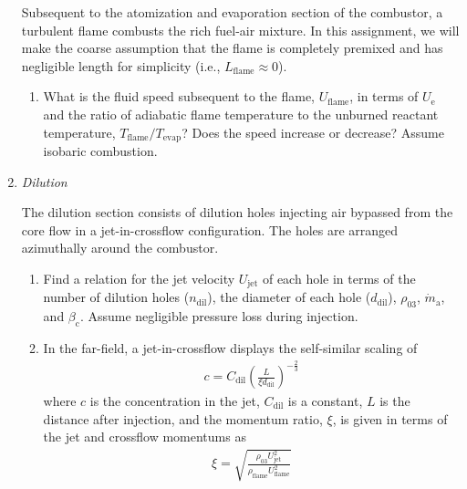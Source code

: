 \documentclass[11pt]{article}
\begin{document}
\begin{enumerate}[label=(\alph*)]
    	Subsequent to the atomization and evaporation section of the combustor, a turbulent flame combusts the rich fuel-air mixture. In this assignment, we will make the coarse assumption that the flame is completely premixed and has negligible length for simplicity (i.e., $L_\mathrm{flame}\approx 0$).  
        \begin{enumerate}[label=(\roman*)]
        	\item
            	What is the fluid speed subsequent to the flame, $U_\mathrm{flame}$, in terms of $U_\mathrm{e}$ and the ratio of adiabatic flame temperature to the unburned reactant temperature, $T_\mathrm{flame}/T_\mathrm{evap}$? Does the speed increase or decrease? Assume isobaric combustion.
            \end{enumerate}
	\item \textit{Dilution}
		
        The dilution section consists of dilution holes injecting air bypassed from the core flow in a jet-in-crossflow configuration. The holes are arranged azimuthally around the combustor.
         \begin{enumerate}[label=(\roman*)]
         	\item
            	Find a relation for the jet velocity $U_{\mathrm{jet}}$ of each hole in terms of the number of dilution holes ($n_\mathrm{dil}$), the diameter of each hole ($d_\mathrm{dil}$), $\rho_\mathrm{03}$, $\dot m_\mathrm{a}$, and $\beta_\mathrm{c}$. Assume negligible pressure loss during injection.
            \item
            	In the far-field, a jet-in-crossflow displays the self-similar scaling of 
                \begin{equation}
                	\begin{aligned}
                    	c = C_\mathrm{dil}\left(\frac{L}{\xi d_\mathrm{dil}}\right)^{-\frac{2}{3}}
                    \end{aligned}
                \end{equation}
                where $c$ is the concentration in the jet, $C_\mathrm{dil}$ is a constant, $L$ is the distance after injection, and the momentum ratio, $\xi$, is given in terms of the jet and crossflow momentums as
                \begin{equation}
                	\label{EQ_JIC}
                	\begin{aligned}
                	\xi=\sqrt{\frac{\rho_\mathrm{03}U_\mathrm{jet}^2}{\rho_\mathrm{flame}U_\mathrm{flame}^2}}
                    \end{aligned}
                \end{equation}
         

\end{enumerate}
\end{enumerate}
\end{document}
